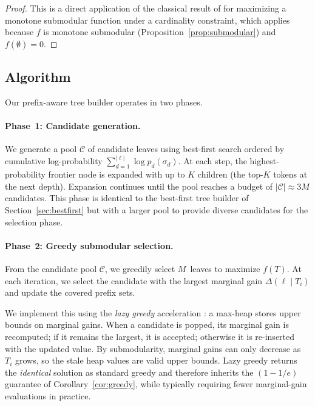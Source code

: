 \begin{proof}
This is a direct application of the classical result of
\citet{nemhauser1978} for maximizing a monotone submodular function
under a cardinality constraint, which applies because $f$ is monotone
submodular (Proposition~\ref{prop:submodular}) and
$f(\emptyset) = 0$.
\end{proof}

\subsection{Algorithm}
\label{sec:algorithm}

Our prefix-aware tree builder operates in two phases.

\paragraph{Phase~1: Candidate generation.}
We generate a pool $\mathcal{C}$ of candidate leaves using best-first
search ordered by cumulative log-probability
$\sum_{d=1}^{|\ell|} \log p_d(\sigma_d)$.  At each step, the
highest-probability frontier node is expanded with up to $K$ children
(the top-$K$ tokens at the next depth).  Expansion continues until the
pool reaches a budget of $|\mathcal{C}| \approx 3M$ candidates.  This
phase is identical to the best-first tree builder of
Section~\ref{sec:bestfirst} but with a larger pool to provide diverse
candidates for the selection phase.

\paragraph{Phase~2: Greedy submodular selection.}
From the candidate pool $\mathcal{C}$, we greedily select $M$~leaves
to maximize $f(T)$.  At each iteration, we select the candidate with
the largest marginal gain $\Delta(\ell \mid T_i)$ and update the
covered prefix sets.

We implement this using the \emph{lazy greedy} acceleration
\citep{minoux1978}: a max-heap stores upper bounds on marginal gains.
When a candidate is popped, its marginal gain is recomputed; if it
remains the largest, it is accepted; otherwise it is re-inserted with
the updated value.  By submodularity, marginal gains can only decrease
as $T_i$ grows, so the stale heap values are valid upper bounds.  Lazy
greedy returns the \emph{identical} solution as standard greedy and
therefore inherits the $(1 - 1/e)$ guarantee of
Corollary~\ref{cor:greedy}, while typically requiring fewer
marginal-gain evaluations in practice.


